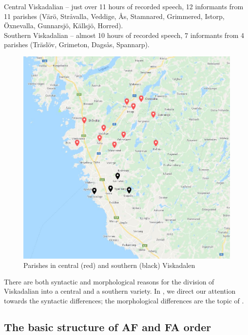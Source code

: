 \documentclass[output=paper,colorlinks,citecolor=brown,draft,draftmode]{langscibook}
\begin{document}
\ea\label{ex:petzell:4}
\ea  Central Viskadalian – just over 11 hours of recorded speech, 12 informants from 11 parishes (Värö, Stråvalla, Veddige, Ås, Stamnared, Grimmered, Istorp, Öxnevalla, Gunnarsjö, Källsjö, Horred).  \\
\ex\label{ex:petzell:4b}  Southern Viskadalian – almost 10 hours of recorded speech, 7 informants from 4 parishes (Träslöv, Grimeton, Dagsås, Spannarp).
\z
\z

\begin{figure}
\includegraphics[width=\textwidth]{figures/a7-img002.jpg}
\caption{\label{figmap:petzell:2}Parishes in central (red) and southern (black) Viskadalen}
\end{figure}



There are both syntactic and morphological reasons for the division of Viskadalian into a central and a southern variety. In , we direct our attention towards the syntactic differences; the morphological differences are the topic of .


\subsection{The basic structure of AF and FA order}\label{sec:petzell:2.2}
\end{document}
